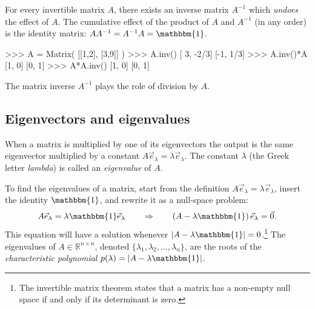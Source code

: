For every invertible matrix $A$,
there exists an inverse matrix $A^{-1}$ which \emph{undoes} the effect of $A$.
The cumulative effect of the product of $A$ and $A^{-1}$ (in any order)
is the identity matrix: $AA^{-1}= A^{-1}A=\mathbbm{1}$.



\small
\begin{verbatimtab}
>>> A = Matrix( [[1,2], 
                 [3,9]] ) 
>>> A.inv()                        
[ 3, -2/3]
[-1,  1/3]
>>> A.inv()*A
[1, 0]
[0, 1]
>>> A*A.inv()
[1, 0]
[0, 1]
\end{verbatimtab}
\normalsize

\noindent
The matrix inverse $A^{-1}$ plays the role of division by $A$.


\vspace{-3mm}

\subsection{Eigenvectors and eigenvalues}
\label{matrices:eigenvectors_and_eigenvalues}

\vspace{-1mm}

		When a matrix is multiplied by one of its eigenvectors the output
		is the same eigenvector multiplied by a constant $A\vec{e}_\lambda =\lambda\vec{e}_\lambda$.
		The constant $\lambda$ (the Greek letter \emph{lambda}) is called an \emph{eigenvalue} of $A$.
		
		To find the eigenvalues of a matrix,  start from the definition $A\vec{e}_\lambda =\lambda\vec{e}_\lambda$,
		insert the identity $\mathbbm{1}$, 
		and rewrite it as a null-space problem:
		\[
			A\vec{e}_\lambda =\lambda\mathbbm{1}\vec{e}_\lambda
			\qquad
			\Rightarrow
			\qquad
			\left(A - \lambda\mathbbm{1}\right)\vec{e}_\lambda = \vec{0}.
		\]
		This equation will have a solution whenever $|A - \lambda\mathbbm{1}|=0$.\footnote{The invertible matrix theorem states
		that a matrix has a non-empty null space if and only if its determinant is zero.}
		The eigenvalues of $A \in \mathbb{R}^{n \times n}$, 
		denoted $\{ \lambda_1, \lambda_2, \ldots, \lambda_n \}$,
		are the roots of the \emph{characteristic polynomial} $p(\lambda)=|A - \lambda \mathbbm{1}|$.
		

